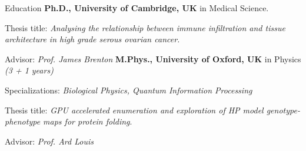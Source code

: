\begin{rubric}{Education}
\entry*[2015 -- 2020]%
	\textbf{Ph.D., University of Cambridge, UK} in Medical Science.
	\par Thesis title: \emph{Analysing the relationship between immune infiltration and tissue architecture in high grade serous ovarian cancer.}
        \par Advisor: \emph{Prof. James Brenton}
%
\entry*[2011 -- 2015]%
	\textbf{M.Phys., University of Oxford, UK} in Physics \emph{ (3 + 1 years)} \par
    Specializations: \emph{Biological Physics, Quantum Information Processing} \par	
    Thesis title: \emph{GPU accelerated enumeration and exploration of HP model genotype-phenotype maps for protein folding}.
    \par Advisor: \emph{Prof. Ard Louis} 
% 
\end{rubric}